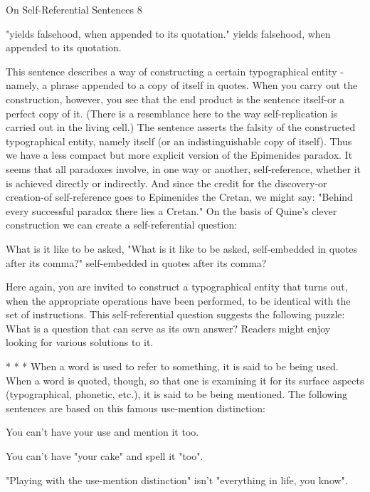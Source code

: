 On Self-Referential Sentences                                                              8

   "yields falsehood, when appended to its quotation." yields falsehood, when
   appended to its quotation.

This sentence describes a way of constructing a certain typographical entity -namely, a
phrase appended to a copy of itself in quotes. When you carry out the construction,
however, you see that the end product is the sentence itself-or a perfect copy of it. (There
is a resemblance here to the way self-replication is carried out in the living cell.) The
sentence asserts the falsity of the constructed typographical entity, namely itself (or an
indistinguishable copy of itself). Thus we have a less compact but more explicit version
of the Epimenides paradox.
         It seems that all paradoxes involve, in one way or another, self-reference, whether
it is achieved directly or indirectly. And since the credit for the discovery-or creation-of
self-reference goes to Epimenides the Cretan, we might say: "Behind every successful
paradox there lies a Cretan."
         On the basis of Quine's clever construction we can create a self-referential
question:

                                 What is it like to be asked,
         "What is it like to be asked, self-embedded in quotes after its comma?"
                         self-embedded in quotes after its comma?

Here again, you are invited to construct a typographical entity that turns out, when the
appropriate operations have been performed, to be identical with the set of instructions.
This self-referential question suggests the following puzzle: What is a question that can
serve as its own answer? Readers might enjoy looking for various solutions to it.

                                     *       *       *
When a word is used to refer to something, it is said to be being used. When a word is
quoted, though, so that one is examining it for its surface aspects (typographical,
phonetic, etc.), it is said to be being mentioned. The following sentences are based on this
famous use-mention distinction:

   You can't have your use and mention it too.

   You can't have "your cake" and spell it "too".

   "Playing with the use-mention distinction" isn't "everything in life, you know".

